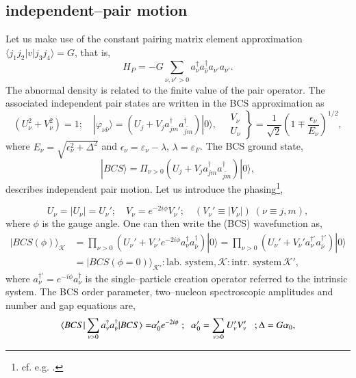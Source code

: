 \subsection{independent--pair motion}\label{C1AppDS2}
Let us make use of the constant pairing matrix element approximation $\langle j_1j_2|v|j_3j_4\rangle=G$, that is, 
\begin{equation}
H_P=-G\sum_{\nu, \nu'>0}a^{\dagger}_\nu a^{\dagger}_{\bar\nu}a_{\nu'} a_{\bar\nu'}.
\end{equation}
 The abnormal density is related to the finite value of the pair operator. The associated independent pair states are written in the BCS approximation as
\begin{equation}
\left(U_\nu^2+V_\nu^2\right)=1;\quad |\varphi_{\nu\bar\nu}\rangle=\left(U_j+V_ja^\dagger_{jm}a^\dagger_{\tilde{jm}}\right)|0\rangle,\quad\left.\begin{array}{c}
V_\nu \\ 
U_\nu
\end{array}\right\}=\frac{1}{\sqrt{2}}\left(1\mp\frac{\epsilon_\nu}{E_\nu}\right)^{1/2},
\end{equation}
where $E_\nu=\sqrt{\epsilon_\nu^2+\Delta^2}$ and $\epsilon_\nu=\varepsilon_\nu-\lambda$, $\lambda=\varepsilon_F$.
The BCS ground state,
\begin{equation}
|BCS\rangle=\Pi_{\nu>0}\left(U_j+V_ja^\dagger_{jm}a^\dagger_{\tilde{jm}}\right)|0\rangle,
\end{equation}
describes independent pair motion.
Let us introduce the phasing\footnote{cf. e.g. \cite{Schrieffer:73}.}, 

\begin{equation}
U_\nu=|U_\nu|=U_\nu';\quad V_\nu=e^{-2i\phi}V_\nu';\quad(V_\nu'\equiv|V_\nu|)\;(\nu\equiv j,m),
\end{equation}
where $\phi$ is the gauge angle. One can then write the  (BCS) wavefunction as, 
\begin{equation}
\begin{split}
|BCS(\phi)\rangle_{\mathcal K}&=\prod_{\nu>0} \left(U_\nu'+V_\nu'e^{-2i\phi}a_\nu^\dagger a_{\bar{\nu}}^\dagger\right)|0\rangle=\prod_{\nu>0}\left(U_\nu'+V_\nu'a_\nu^{\dagger'} a_{\bar{\nu}}^{\dagger'}\right)|0\rangle\\
&=|BCS(\phi=0)\rangle_{\mathcal{K'}}:\text{lab. system},\mathcal{K}:\text{intr. system}\,\mathcal{K}',
\end{split}
\end{equation}
where $a_{\nu}^{\dagger'}=e^{-i\phi}a_{\nu}^{\dagger}$ is the single--particle creation operator referred to the intrinsic system.
The BCS  order parameter,  two--nucleon spectroscopic amplitudes and number and gap equations are,
\begin{equation}
\begin{split}
\langle {BCS|\sum_{\nu>0}a^\dagger_\nu a^\dagger_{\bar\nu}|BCS} \rangle=&\alpha_0'e^{-2i\phi}\; ; \;\;\alpha_0'=\sum_{\nu>0}U_\nu'V_\nu' \;\;\;;\Delta=G\alpha_0,\\
\end{split}
\end{equation}


